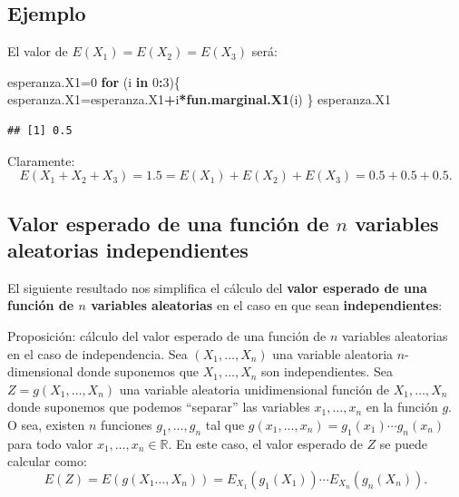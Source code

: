 \documentclass[]{book}
\newenvironment{Shaded}{\begin{snugshade}}{\end{snugshade}}
\newcommand{\ControlFlowTok}[1]{\textcolor[rgb]{0.13,0.29,0.53}{\textbf{#1}}}
\newcommand{\DecValTok}[1]{\textcolor[rgb]{0.00,0.00,0.81}{#1}}
\newcommand{\KeywordTok}[1]{\textcolor[rgb]{0.13,0.29,0.53}{\textbf{#1}}}
\newcommand{\NormalTok}[1]{#1}
\newcommand{\OperatorTok}[1]{\textcolor[rgb]{0.81,0.36,0.00}{\textbf{#1}}}
\begin{document}
\hypertarget{ejemplo-132}{%
\subsection{Ejemplo}\label{ejemplo-132}}

El valor de \(E(X_1)=E(X_2)=E(X_3)\) será:

\begin{Shaded}
\begin{Highlighting}[]
\NormalTok{esperanza.X1=}\DecValTok{0}
\ControlFlowTok{for}\NormalTok{ (i }\ControlFlowTok{in} \DecValTok{0}\OperatorTok{:}\DecValTok{3}\NormalTok{)\{}
\NormalTok{  esperanza.X1=esperanza.X1}\OperatorTok{+}\NormalTok{i}\OperatorTok{*}\KeywordTok{fun.marginal.X1}\NormalTok{(i)}
\NormalTok{\}}
\NormalTok{esperanza.X1}
\end{Highlighting}
\end{Shaded}

\begin{verbatim}
## [1] 0.5
\end{verbatim}

Claramente:
\[
E(X_1+X_2+X_3)=1.5=E(X_1)+E(X_2)+E(X_3)=0.5+0.5+0.5.
\]

\hypertarget{valor-esperado-de-una-funciuxf3n-de-n-variables-aleatorias-independientes}{%
\subsection{\texorpdfstring{Valor esperado de una función de \(n\) variables aleatorias independientes}{Valor esperado de una función de n variables aleatorias independientes}}\label{valor-esperado-de-una-funciuxf3n-de-n-variables-aleatorias-independientes}}

El siguiente resultado nos simplifica el cálculo del \textbf{valor esperado de una función de \(n\) variables aleatorias} en el caso en que sean \textbf{independientes}:

Proposición: cálculo del valor esperado de una función de \(n\) variables aleatorias en el caso de independencia.
Sea \((X_1,\ldots,X_n)\) una variable aleatoria \(n\)-dimensional donde suponemos que \(X_1,\ldots,X_n\) son independientes.
Sea \(Z=g(X_1,\ldots,X_n)\) una variable aleatoria unidimensional función de \(X_1,\ldots,X_n\) donde suponemos que podemos ``separar'' las variables \(x_1,\ldots, x_n\) en la función \(g\). O sea, existen \(n\) funciones \(g_1,\ldots, g_n\) tal que \(g(x_1,\ldots,x_n)=g_1(x_1)\cdots g_n(x_n)\) para todo valor \(x_1,\ldots,x_n\in\mathbb{R}\). En este caso, el valor esperado de \(Z\) se puede calcular como:
\[
E(Z)=E(g(X_1\ldots,X_n))=E_{X_1}(g_1(X_1))\cdots E_{X_n}(g_n(X_n)).
\]
\end{document}
